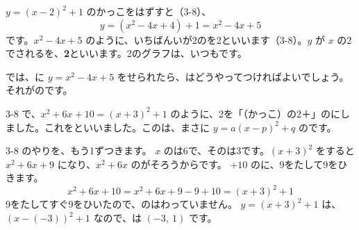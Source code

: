 $y=(x-2)^2+1$ のかっこをはずすと（3-8）、
\[ y=(x^2-4x+4)+1=x^2-4x+5 \]
です。$x^2-4x+5$ のように、いちばんいが2のを2といいます（3-8）。$y$ が $x$ の2でされるを、\textbf{2}といいます。2のグラフは、いつもです。

では、に $y=x^2-4x+5$ をせられたら、はどうやってつければよいでしょう。それがのです。


\leavevmode\label{bk:3-9:heihou}3-8 で、$x^2+6x+10=(x+3)^2+1$ のように、2を「（かっこ）の2＋」のにしました。これを\textbf{}といいました。このは、まさに $y=a(x-p)^2+q$ のです。

3-8 のやりを、もう1ずつきます。
$x$ のは6で、そのは3です。$(x+3)^2$ をすると $x^2+6x+9$ になり、$x^2+6x$ のがそろうからです。
$+10$ のに、9をたして9をひきます。
\[ x^2+6x+10=x^2+6x+9-9+10=(x+3)^2+1 \]
9をたしてすぐ9をひいたので、のはわっていません。
$y=(x+3)^2+1$ は、$(x-(-3))^2+1$ なので、は $(-3,\ 1)$ です。

